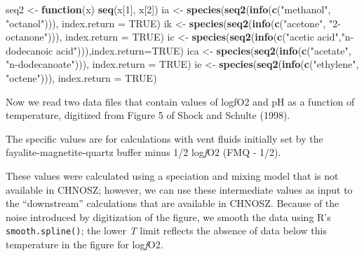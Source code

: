 \documentclass[]{tufte-handout}
\newenvironment{Shaded}{}{}
\newcommand{\KeywordTok}[1]{\textcolor[rgb]{0.00,0.44,0.13}{\textbf{#1}}}
\newcommand{\DataTypeTok}[1]{\textcolor[rgb]{0.56,0.13,0.00}{#1}}
\newcommand{\DecValTok}[1]{\textcolor[rgb]{0.25,0.63,0.44}{#1}}
\newcommand{\StringTok}[1]{\textcolor[rgb]{0.25,0.44,0.63}{#1}}
\newcommand{\OtherTok}[1]{\textcolor[rgb]{0.00,0.44,0.13}{#1}}
\newcommand{\ControlFlowTok}[1]{\textcolor[rgb]{0.00,0.44,0.13}{\textbf{#1}}}
\newcommand{\NormalTok}[1]{#1}
\begin{document}
\begin{Shaded}
\begin{Highlighting}[]
\NormalTok{seq2 <-}\StringTok{ }\ControlFlowTok{function}\NormalTok{(x) }\KeywordTok{seq}\NormalTok{(x[}\DecValTok{1}\NormalTok{], x[}\DecValTok{2}\NormalTok{])}
\NormalTok{ia <-}\StringTok{ }\KeywordTok{species}\NormalTok{(}\KeywordTok{seq2}\NormalTok{(}\KeywordTok{info}\NormalTok{(}\KeywordTok{c}\NormalTok{(}\StringTok{"methanol"}\NormalTok{, }\StringTok{"octanol"}\NormalTok{))), }\DataTypeTok{index.return =} \OtherTok{TRUE}\NormalTok{)}
\NormalTok{ik <-}\StringTok{ }\KeywordTok{species}\NormalTok{(}\KeywordTok{seq2}\NormalTok{(}\KeywordTok{info}\NormalTok{(}\KeywordTok{c}\NormalTok{(}\StringTok{"acetone"}\NormalTok{, }\StringTok{"2-octanone"}\NormalTok{))), }\DataTypeTok{index.return =} \OtherTok{TRUE}\NormalTok{)}
\NormalTok{ic <-}\StringTok{ }\KeywordTok{species}\NormalTok{(}\KeywordTok{seq2}\NormalTok{(}\KeywordTok{info}\NormalTok{(}\KeywordTok{c}\NormalTok{(}\StringTok{"acetic acid"}\NormalTok{,}\StringTok{"n-dodecanoic acid"}\NormalTok{))),}\DataTypeTok{index.return=}\OtherTok{TRUE}\NormalTok{)}
\NormalTok{ica <-}\StringTok{ }\KeywordTok{species}\NormalTok{(}\KeywordTok{seq2}\NormalTok{(}\KeywordTok{info}\NormalTok{(}\KeywordTok{c}\NormalTok{(}\StringTok{"acetate"}\NormalTok{, }\StringTok{"n-dodecanoate"}\NormalTok{))), }\DataTypeTok{index.return =} \OtherTok{TRUE}\NormalTok{)}
\NormalTok{ie <-}\StringTok{ }\KeywordTok{species}\NormalTok{(}\KeywordTok{seq2}\NormalTok{(}\KeywordTok{info}\NormalTok{(}\KeywordTok{c}\NormalTok{(}\StringTok{"ethylene"}\NormalTok{, }\StringTok{"octene"}\NormalTok{))), }\DataTypeTok{index.return =} \OtherTok{TRUE}\NormalTok{)}
\end{Highlighting}
\end{Shaded}

Now we read two data files that contain values of logfO2 and pH as a
function of temperature, digitized from Figure 5 of Shock and Schulte
(1998).

\begin{marginfigure}
The specific values are for calculations with vent fluids initially set
by the fayalite-magnetite-quartz buffer minus 1/2 log\emph{f}O2 (FMQ -
1/2).
\end{marginfigure}

These values were calculated using a speciation and mixing model that is
not available in CHNOSZ; however, we can use these intermediate values
as input to the ``downstream'' calculations that are available in
CHNOSZ. Because of the noise introduced by digitization of the figure,
we smooth the data using R's \texttt{smooth.spline()}; the lower
\emph{T} limit reflects the absence of data below this temperature in
the figure for log\emph{f}O2.
\end{document}
